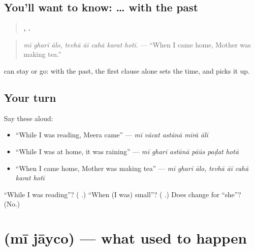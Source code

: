 \subsection*{You'll want to know:  …  with the past}
\begin{quote}
\textbf{  ,     .}
\end{quote}

\begin{quote}
\emph{mī gharī ālo, tevhā āī cahā karat hotī.} — \textquotedblleft{}When I came home, Mother was making tea.\textquotedblright{}
\end{quote}

\textbf{} can stay or go: with the past, the first clause alone sets the time, and \textbf{} picks it up.

\subsection*{Your turn}
Say these aloud:

\begin{itemize}
\raggedright
  \item \textquotedblleft{}While I was reading, Meera came\textquotedblright{} — \emph{mī vācat astānā mīrā ālī}
  \item \textquotedblleft{}While I was at home, it was raining\textquotedblright{} — \emph{mī gharī astānā pāūs paḍat hotā}
  \item \textquotedblleft{}When I came home, Mother was making tea\textquotedblright{} — \emph{mī gharī ālo, tevhā āī cahā karat hotī}
\end{itemize}

\begin{tcolorbox}[breakable,colback=teal!4,colframe=teal!35!black,title={Before you move on}]
\textquotedblleft{}While I was reading\textquotedblright{}? (\textbf{  }.) \textquotedblleft{}When (I was) small\textquotedblright{}? (\textbf{ }.) Does \textbf{} change for \textquotedblleft{}she\textquotedblright{}? (No.)
\end{tcolorbox}
\section[\texorpdfstring{\mr{मी} \mr{जायचो} (mī jāyco)}{मी जायचो (mī jāyco)}]{  (mī jāyco) — what used to happen}

